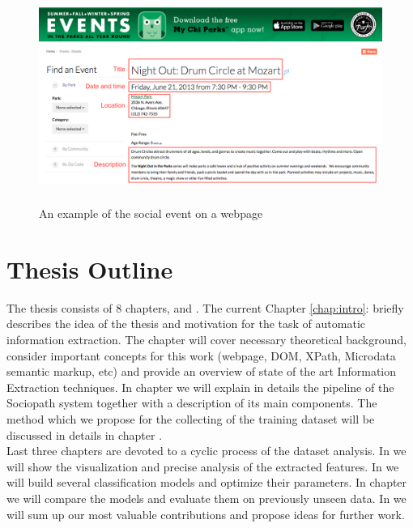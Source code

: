 \begin{figure}[h]
\begin{center}
\includegraphics[height=7cm]{figures01/event_example}
\caption{An example of the social event on a webpage}
\label{fig:webevent}
\end{center}
\end{figure}




\section{Thesis Outline}
The thesis consists of 8 chapters,  and . 
The current Chapter \ref{chap:intro}:  briefly describes the idea of the thesis and motivation for the task of automatic information extraction. The chapter  will cover necessary theoretical background, consider important concepts for this work (webpage, DOM, XPath, Microdata semantic markup, etc) and provide an overview of state of the art Information Extraction techniques. In chapter  we will explain in details the pipeline of the Sociopath system together with a description of its main components. The method which we propose for the collecting of the training dataset will be discussed in details in chapter . \\

Last three chapters are devoted to a cyclic process of the dataset analysis. In  we will show the visualization and precise analysis of the extracted features. In  we will build several classification models and optimize their parameters. In chapter  we will compare the models and evaluate them on previously unseen data. In  we will sum up our most valuable contributions and propose ideas for further work.